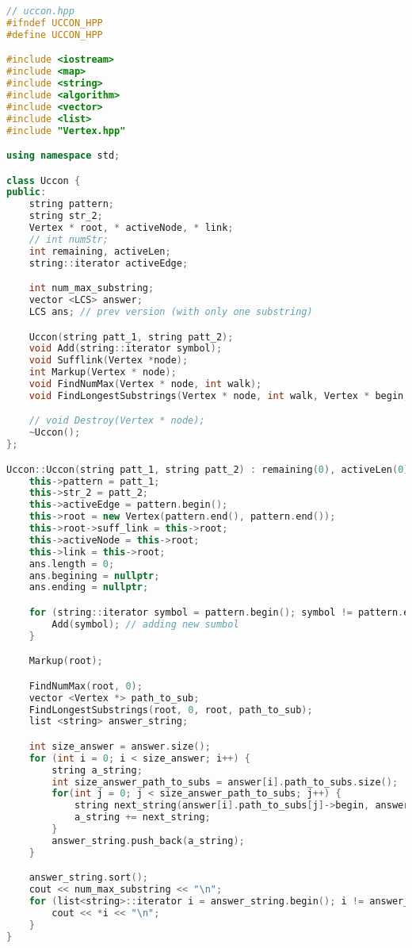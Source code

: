 \begin{lstlisting}[language=C++]
// uccon.hpp
#ifndef UCCON_HPP
#define UCCON_HPP

#include <iostream>
#include <map>
#include <string>
#include <algorithm>
#include <vector>
#include <list>
#include "Vertex.hpp"

using namespace std;

class Uccon {
public:
    string pattern;
    string str_2;
    Vertex * root, * activeNode, * link;
    // int numStr;
    int remaining, activeLen;
    string::iterator activeEdge;

    int num_max_substring;
    vector <LCS> answer;
    LCS ans; // prev version (with only one substring)

    Uccon(string patt_1, string patt_2);
    void Add(string::iterator symbol);
    void Sufflink(Vertex *node);
    int Markup(Vertex * node);
    void FindNumMax(Vertex * node, int walk);
    void FindLongestSubstrings(Vertex * node, int walk, Vertex * begin, vector <Vertex *> path_to_sub);

    // void Destroy(Vertex * node);
    ~Uccon();
};

Uccon::Uccon(string patt_1, string patt_2) : remaining(0), activeLen(0), num_max_substring(0) {
    this->pattern = patt_1;
    this->str_2 = patt_2;
    this->activeEdge = pattern.begin();
    this->root = new Vertex(pattern.end(), pattern.end());
    this->root->suff_link = this->root;
    this->activeNode = this->root;
    this->link = this->root;
    ans.length = 0;
    ans.begining = nullptr;
    ans.ending = nullptr;

    for (string::iterator symbol = pattern.begin(); symbol != pattern.end(); symbol++) {
        Add(symbol); // adding new sumbol
    }

    Markup(root);

    FindNumMax(root, 0);
    vector <Vertex *> path_to_sub;
    FindLongestSubstrings(root, 0, root, path_to_sub);
    list <string> answer_string;

    int size_answer = answer.size();
    for (int i = 0; i < size_answer; i++) {
        string a_string;
        int size_answer_path_to_subs = answer[i].path_to_subs.size();
        for(int j = 0; j < size_answer_path_to_subs; j++) {
            string next_string(answer[i].path_to_subs[j]->begin, answer[i].path_to_subs[j]->end + 1);
            a_string += next_string;
        }
        answer_string.push_back(a_string);
    }

    answer_string.sort();
    cout << num_max_substring << "\n";
    for (list<string>::iterator i = answer_string.begin(); i != answer_string.end(); i++) {
        cout << *i << "\n";
    }
}


\end{lstlisting}
